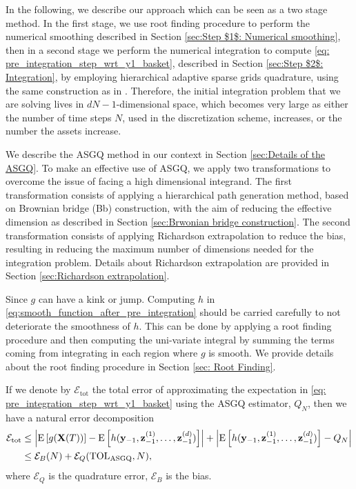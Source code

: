 In the following, we describe our approach which can be seen as a two stage method. In the first stage, we use root finding procedure to perform the numerical smoothing described in Section \ref{sec:Step $1$: Numerical smoothing}, then in a second stage we perform the numerical integration to compute \eqref{eq: pre_integration_step_wrt_y1_basket}, described in Section \ref{sec:Step $2$: Integration}, by employing hierarchical adaptive sparse grids  quadrature, using the same construction as in  \cite{haji2016multi}. Therefore, the initial integration problem that we are solving lives in $dN-1$-dimensional space, which becomes very large as either the number of time steps $N$, used in the discretization  scheme, increases, or the number the assets increase. 

We describe the  ASGQ method in our context in Section \ref{sec:Details of the ASGQ}.  To make an effective use of ASGQ, we  apply two transformations to overcome the issue of facing a high dimensional integrand. The first transformation consists of applying a hierarchical  path generation method, based on Brownian bridge (Bb) construction, with the aim of reducing the effective dimension as  described  in Section \ref{sec:Brwonian bridge construction}. The second transformation consists of applying Richardson extrapolation to reduce the bias, resulting in reducing  the maximum number of dimensions needed for the integration problem. Details about  Richardson extrapolation  are provided in Section \ref{sec:Richardson extrapolation}.

Since $g$ can have a kink  or jump. Computing $h$ in \eqref{eq:smooth_function_after_pre_integration}  should be carried carefully to not deteriorate the smoothness of $h$. This can be done by applying a root finding procedure and then computing the uni-variate integral by summing the terms coming from integrating in each region where $g$ is smooth. We provide details about the root finding procedure in Section \ref{sec: Root Finding}.

If we denote by $\mathcal{E}_{\text{tot}}$ the total error of approximating the  expectation in \eqref{eq: pre_integration_step_wrt_y1_basket} using the ASGQ estimator, $Q_N$, then we have a natural error decomposition
\begin{align}\label{eq:total_error}
\mathcal{E}_{\text{tot}} & \le \left\lvert\mathrm{E}\left[g(\mathbf{X}(T))\right]- \mathrm{E}\left[h(\mathbf{y}_{-1}, \mathbf{z}^{(1)}_{-1},\dots,\mathbf{z}^{(d)}_{-1} )\right]\right\rvert+\left\lvert\mathrm{E}\left[h(\mathbf{y}_{-1}, \mathbf{z}^{(1)}_{-1},\dots,\mathbf{z}^{(d)}_{-1} )\right]-Q_{N}\right\rvert\nonumber\\
  & \le \mathcal{E}_B(N)+ \mathcal{E}_Q(\text{TOL}_{\text{ASGQ}},N),
\end{align}
where  $\mathcal{E}_Q$ is the quadrature error, $\mathcal{E}_B$  is the bias.

